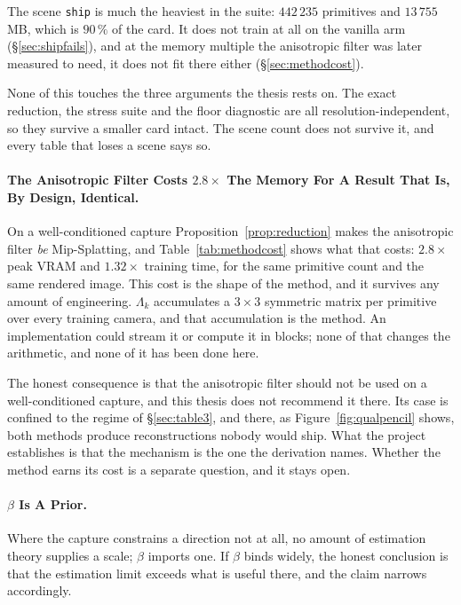 The scene \texttt{ship} is much the heaviest in the suite: $442\,235$ primitives
and $13\,755$\,MB, which is $90\,\%$ of the card. It does not train at all on
the vanilla arm (\S\ref{sec:shipfails}), and at the memory multiple the anisotropic filter was
later measured to need, it does not fit there either (\S\ref{sec:methodcost}).

None of this touches the three arguments the thesis rests on. The exact
reduction, the stress suite and the floor diagnostic are all
resolution-independent, so they survive a smaller card intact. The scene count
does not survive it, and every table that loses a scene says so.

\paragraph{The Anisotropic Filter Costs $2.8\times$ The Memory For A Result That Is, By Design,
Identical.} On a well-conditioned capture Proposition~\ref{prop:reduction} makes
the anisotropic filter \emph{be} Mip-Splatting, and Table~\ref{tab:methodcost} shows what that
costs: $2.8\times$ peak VRAM and $1.32\times$ training time, for the same
primitive count and the same rendered image. This cost is the shape of the method, and it survives any amount of engineering. $\Lambda_k$ accumulates a $3\times3$ symmetric
matrix per primitive over every training camera, and that accumulation is the
method. An implementation could stream it or compute it in blocks; none of that
changes the arithmetic, and none of it has been done here.

The honest consequence is that the anisotropic filter should not be used on a well-conditioned
capture, and this thesis does not recommend it there. Its case is confined to
the regime of \S\ref{sec:table3}, and there, as
Figure~\ref{fig:qualpencil} shows, both methods produce reconstructions nobody
would ship. What the project establishes is that the mechanism is the one the derivation
names. Whether the method earns its cost is a separate question, and it stays
open.

\paragraph{$\beta$ Is A Prior.} Where the capture constrains a
direction not at all, no amount of estimation theory supplies a scale; $\beta$
imports one. If $\beta$ binds widely, the honest conclusion is that the
estimation limit exceeds what is useful there, and the claim narrows accordingly.

